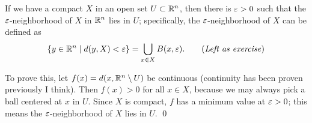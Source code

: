 \newpage 
\begin{simplethm}
    If we have a compact $X$ in an open set $U \subset \mathbb R^n$, then there is $\varepsilon > 0$ such that the $\varepsilon$-neighborhood of $X$ in $\mathbb R^n$ lies in $U$; specifically, the $\varepsilon$-neighborhood of $X$ can be defined as 
    \[ \{y \in \RR^n \mid d(y, X) < \eps\} = \bigcup_{x \in X} B(x, \eps). \tag{\textit{Left as exercise}} \]
\end{simplethm}
\noindent To prove this, let $f(x) = d(x, \mathbb R^n \setminus U)$ be continuous (continuity has been proven previously I think). Then $f(x) > 0$ for all $x \in X$, because we may always pick a ball centered at $x$ in $U$. Since $X$ is compact, $f$ has a minimum value at $\varepsilon > 0$; this means the $\varepsilon$-neighborhood of $X$ lies in $U$. \qed
